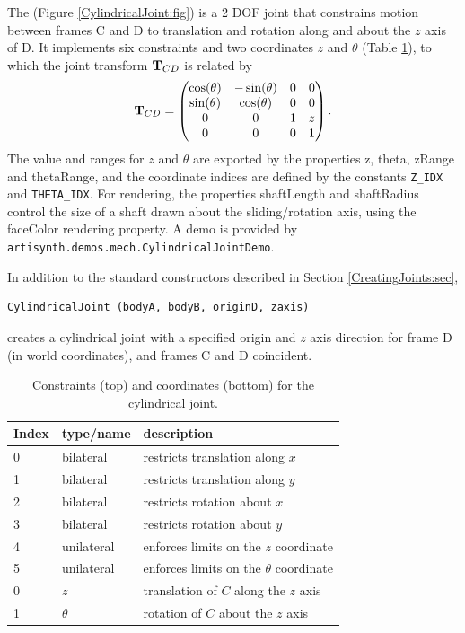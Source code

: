 The  
(Figure \ref{CylindricalJoint:fig}) is a 2 DOF
joint that constrains motion between frames C and D to translation and
rotation along and about the $z$ axis of D.  It implements six
constraints and two coordinates $z$ and $\theta$
(Table \ref{CylindricalConstraints:tbl}), to which the joint transform
${\bf T}_{CD}$ is related by
%
\begin{equation*}
{\bf T}_{CD} = \left(\begin{matrix}
\cos(\theta) & -\sin(\theta) & 0 & 0 \\
\sin(\theta) &  \cos(\theta) & 0 & 0 \\
0 & 0 & 1 & z \\
0 & 0 & 0 & 1 
\end{matrix}\right).
\end{equation*}
The value and ranges for $z$ and $\theta$ are exported by the
properties {\sf z}, {\sf theta}, {\sf zRange} and {\sf thetaRange},
and the coordinate indices are defined by the constants {\tt Z\_IDX}
and {\tt THETA\_IDX}. For rendering, the properties {\sf shaftLength}
and {\sf shaftRadius} control the size of a shaft drawn about the
sliding/rotation axis, using the {\sf faceColor} rendering property.
A demo is provided by {\tt artisynth.demos.mech.CylindricalJointDemo}.

In addition to the standard constructors described in
Section \ref{CreatingJoints:sec},
\begin{lstlisting}[]
  CylindricalJoint (bodyA, bodyB, originD, zaxis)
\end{lstlisting}
%
creates a cylindrical joint with a specified origin and $z$ axis direction
for frame D (in world coordinates), and frames C and D coincident.

\begin{table}[h]
\centering
\begin{tabular}{|l|l|l|}
\hline
Index & type/name & description \\
\hline
0 & bilateral & restricts translation along $x$ \\
1 & bilateral & restricts translation along $y$ \\
2 & bilateral & restricts rotation about $x$ \\
3 & bilateral & restricts rotation about $y$ \\
4 & unilateral & enforces limits on the $z$ coordinate \\
5 & unilateral & enforces limits on the $\theta$ coordinate \\
\hline
\hline
0 & $z$ & translation of $C$ along the $z$ axis \\
1 & $\theta$ & rotation of $C$ about the $z$ axis \\
\hline
\end{tabular}
\caption{Constraints (top) and coordinates (bottom) for the cylindrical joint.}
\label{CylindricalConstraints:tbl}
\end{table}

